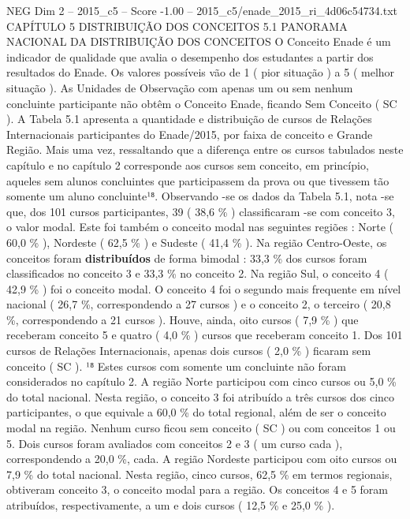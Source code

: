\begin{textsample}{NEG Dim 2 – 2015\_c5 – Score -1.00 – 2015\_c5/enade\_2015\_ri\_4d06c54734.txt}  \label{ex:f2_neg_158}
CAPÍTULO 5 DISTRIBUIÇÃO DOS CONCEITOS 5.1 PANORAMA NACIONAL DA DISTRIBUIÇÃO DOS CONCEITOS O Conceito Enade é um indicador de qualidade que avalia o desempenho dos estudantes a partir dos resultados do Enade.
Os valores possíveis vão de 1 ( pior situação ) a 5 ( melhor situação ).
As Unidades de Observação com apenas um ou sem nenhum concluinte participante não obtêm o Conceito Enade, ficando Sem Conceito ( SC ).
A Tabela 5.1 apresenta a quantidade e distribuição de cursos de Relações Internacionais participantes do Enade/2015, por faixa de conceito e Grande Região.
Mais uma vez, ressaltando que a diferença entre os cursos tabulados neste capítulo e no capítulo 2 corresponde aos cursos sem conceito, em princípio, aqueles sem alunos concluintes que participassem da prova ou que tivessem tão somente um aluno concluinte¹⁸.
Observando -se os dados da Tabela 5.1, nota -se que, dos 101 cursos participantes, 39 ( 38,6 \% ) classificaram -se com conceito 3, o valor modal.
Este foi também o conceito modal nas seguintes regiões : Norte ( 60,0 \% ), Nordeste ( 62,5 \% ) e Sudeste ( 41,4 \% ).
Na região Centro-Oeste, os conceitos foram \textbf{distribuídos} de forma bimodal : 33,3 \% dos cursos foram classificados no conceito 3 e 33,3 \% no conceito 2.
Na região Sul, o conceito 4 ( 42,9 \% ) foi o conceito modal.
O conceito 4 foi o segundo mais frequente em nível nacional ( 26,7 \%, correspondendo a 27 cursos ) e o conceito 2, o terceiro ( 20,8 \%, correspondendo a 21 cursos ).
Houve, ainda, oito cursos ( 7,9 \% ) que receberam conceito 5 e quatro ( 4,0 \% ) cursos que receberam conceito 1.
Dos 101 cursos de Relações Internacionais, apenas dois cursos ( 2,0 \% ) ficaram sem conceito ( SC ). ¹⁸ Estes cursos com somente um concluinte não foram considerados no capítulo 2.
A região Norte participou com cinco cursos ou 5,0 \% do total nacional.
Nesta região, o conceito 3 foi atribuído a três cursos dos cinco participantes, o que equivale a 60,0 \% do total regional, além de ser o conceito modal na região.
Nenhum curso ficou sem conceito ( SC ) ou com conceitos 1 ou 5.
Dois cursos foram avaliados com conceitos 2 e 3 ( um curso cada ), correspondendo a 20,0 \%, cada.
A região Nordeste participou com oito cursos ou 7,9 \% do total nacional.
Nesta região, cinco cursos, 62,5 \% em termos regionais, obtiveram conceito 3, o conceito modal para a região.
Os conceitos 4 e 5 foram atribuídos, respectivamente, a um e dois cursos ( 12,5 \% e 25,0 \% ).

\end{textsample}
